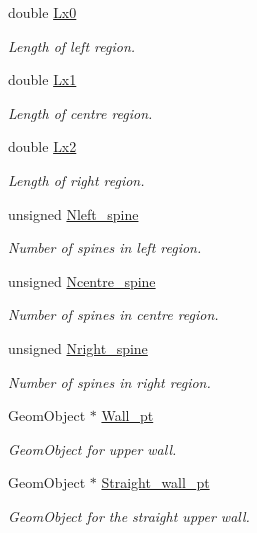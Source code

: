 \begin{DoxyCompactItemize}
double \hyperlink{classoomph_1_1ChannelSpineMesh_a3d61af363a8da156f4fe6d10e62f73c6}{Lx0}
\begin{DoxyCompactList}\small\item\em Length of left region. \end{DoxyCompactList}\item 
double \hyperlink{classoomph_1_1ChannelSpineMesh_a35f5d840478b2b93199a393cbdb50f2d}{Lx1}
\begin{DoxyCompactList}\small\item\em Length of centre region. \end{DoxyCompactList}\item 
double \hyperlink{classoomph_1_1ChannelSpineMesh_a4c295478a3f79335f5d0113da220844e}{Lx2}
\begin{DoxyCompactList}\small\item\em Length of right region. \end{DoxyCompactList}\item 
unsigned \hyperlink{classoomph_1_1ChannelSpineMesh_a56fbad56271c5e37cd7f1d2de7b7bb36}{Nleft\+\_\+spine}
\begin{DoxyCompactList}\small\item\em Number of spines in left region. \end{DoxyCompactList}\item 
unsigned \hyperlink{classoomph_1_1ChannelSpineMesh_af6ef1bb007083a803561e5f0062f820b}{Ncentre\+\_\+spine}
\begin{DoxyCompactList}\small\item\em Number of spines in centre region. \end{DoxyCompactList}\item 
unsigned \hyperlink{classoomph_1_1ChannelSpineMesh_a56f7259d8e5dee66a8c83ffe99526c62}{Nright\+\_\+spine}
\begin{DoxyCompactList}\small\item\em Number of spines in right region. \end{DoxyCompactList}\item 
Geom\+Object $\ast$ \hyperlink{classoomph_1_1ChannelSpineMesh_adaa23badd05b69c905b444bd9141b3a7}{Wall\+\_\+pt}
\begin{DoxyCompactList}\small\item\em Geom\+Object for upper wall. \end{DoxyCompactList}\item 
Geom\+Object $\ast$ \hyperlink{classoomph_1_1ChannelSpineMesh_a34f4583f2aa944d5d1ff723f6a4123bf}{Straight\+\_\+wall\+\_\+pt}
\begin{DoxyCompactList}\small\item\em Geom\+Object for the straight upper wall. \end{DoxyCompactList}\end{DoxyCompactItemize}


